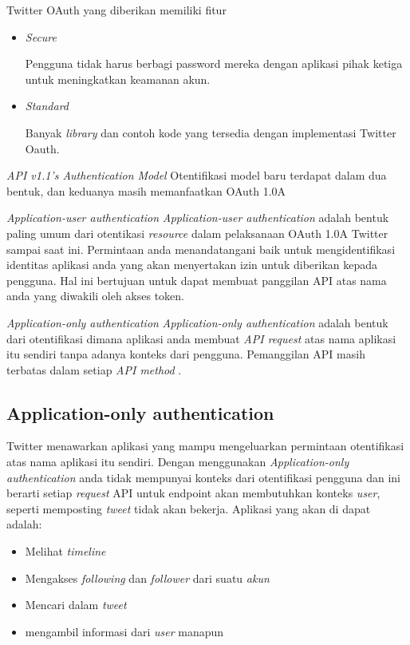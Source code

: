 Twitter OAuth yang diberikan memiliki fitur
\begin{itemize}
	\item \textit{Secure}
	
	Pengguna tidak harus berbagi password mereka dengan aplikasi pihak ketiga untuk meningkatkan keamanan akun.
	\item \textit{Standard}
	
	Banyak \textit{library} dan contoh kode yang tersedia dengan implementasi Twitter Oauth.
\end{itemize}

\textit{API v1.1's Authentication Model}
Otentifikasi model baru terdapat dalam dua bentuk, dan keduanya masih memanfaatkan OAuth 1.0A


\textit{Application-user authentication}
\textit{Application-user authentication} adalah bentuk paling umum dari otentikasi \textit{resource} dalam pelaksanaan OAuth 1.0A Twitter sampai saat ini. Permintaan anda menandatangani baik untuk mengidentifikasi identitas aplikasi anda yang akan menyertakan izin untuk diberikan kepada pengguna. Hal ini bertujuan untuk dapat membuat panggilan API atas nama anda yang diwakili oleh akses token.

\textit{Application-only authentication}
\textit{Application-only authentication} adalah bentuk dari otentifikasi dimana aplikasi anda membuat \textit{API request} atas nama aplikasi itu sendiri tanpa adanya konteks dari pengguna. Pemanggilan API masih terbatas dalam setiap \textit{API method} .


\subsection{Application-only authentication}
Twitter menawarkan aplikasi yang mampu mengeluarkan permintaan otentifikasi atas nama aplikasi itu sendiri. Dengan menggunakan \textit{Application-only authentication} anda tidak mempunyai konteks dari otentifikasi pengguna dan ini berarti setiap \textit{request} API untuk endpoint akan membutuhkan konteks \textit{user}, seperti memposting \textit{tweet} tidak akan bekerja. Aplikasi yang akan di dapat adalah: 

\begin{itemize}
	\item Melihat \textit{timeline}
	\item Mengakses \textit{following} dan \textit{follower} dari suatu \textit{akun}
	\item Mencari dalam \textit{tweet}
	\item mengambil informasi dari \textit{user} manapun
\end{itemize}



